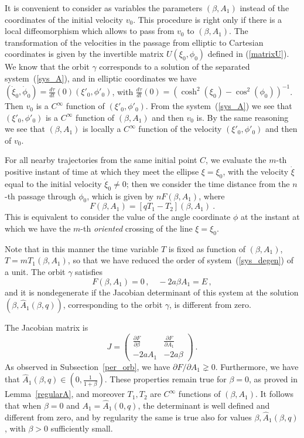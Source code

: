 \documentclass[a4paper]{article}
\begin{document}
It is convenient to consider as variables the parameters $(\beta,
A_1)$ instead of the coordinates of the initial velocity $v_0$. This
procedure is right only if there is a local diffeomorphism which
allows to pass from $v_0$ to $(\beta,A_1)$. The transformation of the
velocities in the passage from elliptic to Cartesian coordinates is
given by the invertible matrix $U(\xi_0,\phi_0)$ defined in
(\ref{matrixU}).  We know that the orbit $\gamma$ corresponds to a
solution of the separated system~(\ref{sys_A}), and in elliptic
coordinates we have
$(\dot{\xi}_0,\dot{\phi}_0)=\frac{d\tau}{dt}(0)(\xi'_0,\phi'_0)$, with
$\frac{d\tau}{dt}(0) = (\cosh^2(\xi_0) - \cos^2(\phi_0))^{-1}$. Then
$v_0$ is a $C^{\infty}$ function of $(\xi'_0,\phi'_0)$. From the
system~(\ref{sys_A}) we see that $(\xi'_0,\phi'_0)$ is a $C^{\infty}$
function of $(\beta,A_1)$ and then $v_0$ is. By the same reasoning we
see that $(\beta,A_1)$ is locally a $C^{\infty}$ function of the
velocity $(\xi'_0,\phi'_0)$ and then of $v_0$.

For all nearby trajectories from the same initial point $C$, we
evaluate the $m$-th positive instant of time at which they meet the
ellipse $\xi=\xi_0$, with the velocity $\dot{\xi}$ equal to the
initial velocity $\dot{\xi}_0 \neq 0$; then we consider the time
distance from the $n$-th passage through $\phi_0$, which is given by
$nF(\beta,A_1)$, where
\[
F(\beta,A_1)=[qT_1-T_2](\beta,A_1)\ .
\] 
This is equivalent to consider the value of the angle coordinate
$\phi$ at the instant at which we have the $m$-th \emph{oriented}
crossing of the line $\xi=\xi_0$.

Note that in this manner the time variable $T$ is fixed as function of
$(\beta, A_1)$, $T=mT_1(\beta,A_1)$, so that we have reduced the order
of system~(\ref{sys_degen}) of a unit.  The orbit $\gamma$ satisfies
\[
F(\beta,A_1)=0\,, \quad -2a \beta A_1=E\,,
\]
and it is nondegenerate if the Jacobian determinant of this system at
the solution $(\beta,\hat{A}_1(\beta,q))$, corresponding to the orbit
$\gamma$, is different from zero.

The Jacobian matrix is 
\[ J=
\left(
\begin{array}{cc}
\frac{\partial F}{\partial \beta} & 
\frac{\partial F}{\partial A_1} \\
-2a A_1 &
-2a \beta
\end{array}
\right)\ .
\]
As observed in Subsection~\ref{per_orb}, we have $\partial F/\partial
A_1 \gneq 0$. Furthermore, we have that $\hat{A}_1(\beta,q) \in
(0,\frac{1}{1+\beta})$. These properties remain true for $\beta =0$,
as proved in Lemma~\ref{regularA}, and moreover $T_1,T_2$ are
$C^{\infty}$ functions of $(\beta,A_1)$.  It follows that when $\beta
=0$ and $A_1=\hat{A}_1(0,q)$, the determinant is well defined and
different from zero, and by regularity the same is true also for
values $\beta,\hat{A}_1(\beta,q)$, with $\beta>0$ sufficiently small.
\end{document}
